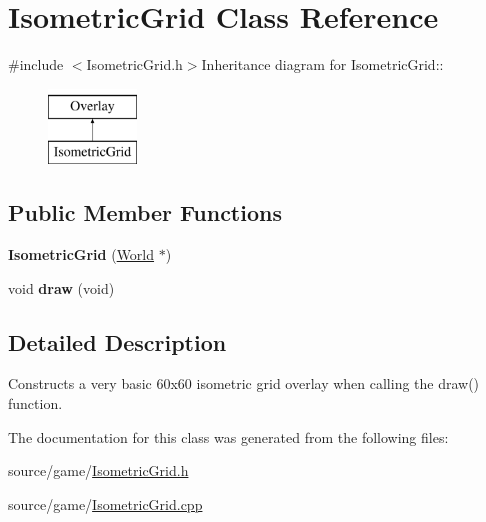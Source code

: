 \hypertarget{classIsometricGrid}{
\section{IsometricGrid Class Reference}
\label{classIsometricGrid}
}


{\ttfamily \#include $<$IsometricGrid.h$>$}Inheritance diagram for IsometricGrid::\begin{figure}[H]
\begin{center}
\leavevmode
\includegraphics[height=2cm]{classIsometricGrid}
\end{center}
\end{figure}
\subsection*{Public Member Functions}
\begin{DoxyCompactItemize}
\item 
\hypertarget{classIsometricGrid_a4ac39773481a3937b415a71e8e7a29bd}{
{\bfseries IsometricGrid} (\hyperlink{classWorld}{World} $\ast$)}
\label{classIsometricGrid_a4ac39773481a3937b415a71e8e7a29bd}

\item 
\hypertarget{classIsometricGrid_a3138024ea901361f87a47c008fe4f31d}{
void {\bfseries draw} (void)}
\label{classIsometricGrid_a3138024ea901361f87a47c008fe4f31d}

\end{DoxyCompactItemize}


\subsection{Detailed Description}
Constructs a very basic 60x60 isometric grid overlay when calling the draw() function. 

The documentation for this class was generated from the following files:\begin{DoxyCompactItemize}
\item 
source/game/\hyperlink{IsometricGrid_8h}{IsometricGrid.h}\item 
source/game/\hyperlink{IsometricGrid_8cpp}{IsometricGrid.cpp}\end{DoxyCompactItemize}
